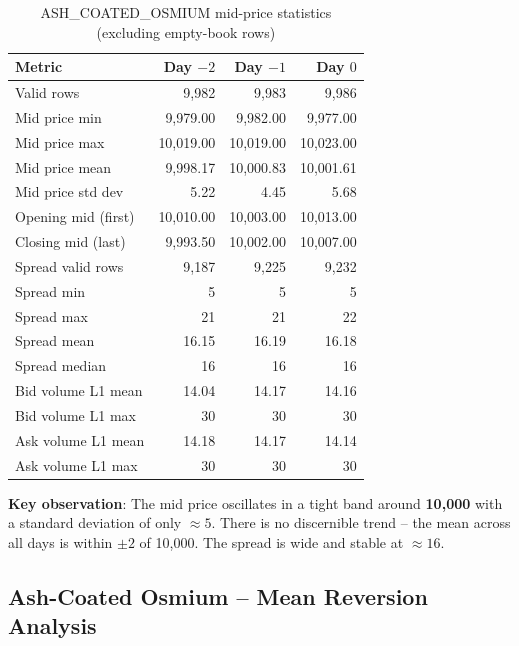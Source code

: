 \documentclass[11pt,a4paper]{article}
\begin{document}
\begin{table}[H]
\centering
\caption{ASH\_COATED\_OSMIUM mid-price statistics (excluding empty-book rows)}
\begin{tabular}{@{}lrrr@{}}
\toprule
\textbf{Metric} & \textbf{Day $-2$} & \textbf{Day $-1$} & \textbf{Day $0$} \\
\midrule
Valid rows              & 9,982       & 9,983       & 9,986 \\
Mid price min           & 9,979.00    & 9,982.00    & 9,977.00 \\
Mid price max           & 10,019.00   & 10,019.00   & 10,023.00 \\
Mid price mean          & 9,998.17    & 10,000.83   & 10,001.61 \\
Mid price std dev       & 5.22        & 4.45        & 5.68 \\
Opening mid (first)     & 10,010.00   & 10,003.00   & 10,013.00 \\
Closing mid (last)      & 9,993.50    & 10,002.00   & 10,007.00 \\
\midrule
Spread valid rows       & 9,187       & 9,225       & 9,232 \\
Spread min              & 5           & 5           & 5 \\
Spread max              & 21          & 21          & 22 \\
Spread mean             & 16.15       & 16.19       & 16.18 \\
Spread median           & 16          & 16          & 16 \\
\midrule
Bid volume L1 mean      & 14.04       & 14.17       & 14.16 \\
Bid volume L1 max       & 30          & 30          & 30 \\
Ask volume L1 mean      & 14.18       & 14.17       & 14.14 \\
Ask volume L1 max       & 30          & 30          & 30 \\
\bottomrule
\end{tabular}
\end{table}

\textbf{Key observation}: The mid price oscillates in a tight band around \textbf{10,000} with a standard deviation of only $\approx 5$. There is no discernible trend -- the mean across all days is within $\pm 2$ of 10,000. The spread is wide and stable at $\approx 16$.

\subsection{Ash-Coated Osmium -- Mean Reversion Analysis}
\end{document}
